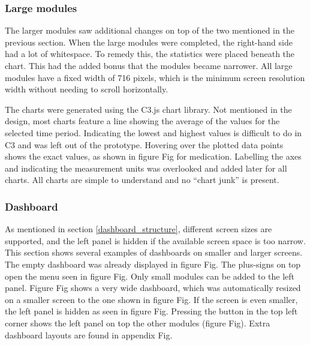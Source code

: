         \subsubsection{Large modules}

        The larger modules saw additional changes on top of the two mentioned in the previous section. When the large modules were completed, the right-hand side had a lot of whitespace. To remedy this, the statistics were placed beneath the chart. This had the added bonus that the modules became narrower. All large modules have a fixed width of 716 pixels, which is the minimum screen resolution width without needing to scroll horizontally.

        The charts were generated using the C3.js chart library. Not mentioned in the design, most charts feature a line showing the average of the values for the selected time period. Indicating the lowest and highest values is difficult to do in C3 and was left out of the prototype. Hovering over the plotted data points shows the exact values, as shown in figure Fig for medication. Labelling the axes and indicating the measurement units was overlooked and added later for all charts. All charts are simple to understand and no ``chart junk'' is present.

        \subsubsection{Dashboard}

        As mentioned in section \ref{dashboard_structure}, different screen sizes are supported, and the left panel is hidden if the available screen space is too narrow. This section shows several examples of dashboards on smaller and larger screens. The empty dashboard was already displayed in figure Fig. The plus-signs on top open the menu seen in figure Fig. Only small modules can be added to the left panel. Figure Fig shows a very wide dashboard, which was automatically resized on a smaller screen to the one shown in figure Fig. If the screen is even smaller, the left panel is hidden as seen in figure Fig. Pressing the button in the top left corner shows the left panel on top the other modules (figure Fig). Extra dashboard layouts are found in appendix Fig. %